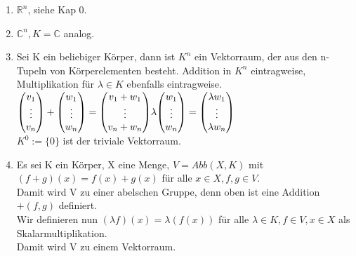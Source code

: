 \documentclass{scrartcl}
\newcommand{\lb}{\lambda}
\newcommand{\C}{\mathbb{C}}
\newcommand{\mRn}{\(\mathbb{R}^n\)}
\newcommand{\ve}[1]{{\begin{pmatrix}#1 \end{pmatrix}}}
\renewcommand{\v}{\ve}
\begin{document}
\begin{enumerate}
\item{\mRn, siehe Kap 0.}
\item{\(\C^n, K = \C\) analog.}
\item{Sei K ein beliebiger K\"orper, dann ist \(K^n\) ein Vektorraum, der aus den n-Tupeln von K\"orperelementen besteht. Addition in \(K^n\) eintragweise, Multiplikation f\"ur \(\lb \in K\) ebenfalls eintragweise.\\
\(
\v{v_1\\ \vdots\\ v_n} + \v{w_1\\ \vdots\\ w_n} = \v{v_1 + w_1\\ \vdots \\ v_n + w_n}\\
\lb \v{w_1\\ \vdots\\ w_n} = \v{\lb w_1\\ \vdots \\ \lb w_n}
\)\\
\(K^0 := \{0\}\) ist der triviale Vektorraum.}
\item{Es sei K ein K\"orper, X eine Menge, \(V = Abb(X, K)\) mit\\
\((f + g)(x) = f(x) + g(x)\) f\"ur alle \(x \in X, f, g \in V\).\\
Damit wird V zu einer abelschen Gruppe, denn oben ist eine Addition \(+(f, g)\) definiert.\\
Wir definieren nun \((\lb f)(x) = \lb (f(x))\) f\"ur alle \(\lb \in K, f \in V, x \in X\) als Skalarmultiplikation.\\
Damit wird V zu einem Vektorraum.
}
\end{enumerate}
\end{document}
